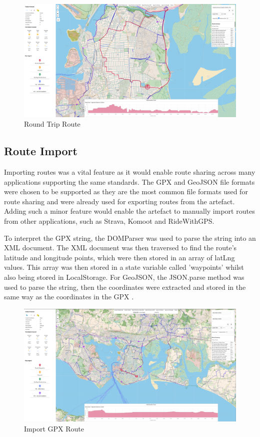 \begin{figure}[!ht]
  \centering
  \includegraphics[width=425px]{figures/Progress Images/Iteration-3/SR11/SR11- Round Trip functionality working.png}
  \caption{Round Trip Route}
  \label{fig:round-trip}
\end{figure}

\subsection{Route Import}
\label{iteration3:route-import}

Importing routes was a vital feature as it would enable route sharing across many applications supporting the same standards. The GPX and GeoJSON file formats were chosen to be supported as they are the most common file formats used for route sharing and were already used for exporting routes from the artefact. Adding such a minor feature would enable the artefact to manually import routes from other applications, such as Strava, Komoot and RideWithGPS.

To interpret the GPX string, the DOMParser was used to parse the string into an XML document. The XML document was then traversed to find the route's latitude and longitude points, which were then stored in an array of latLng values. This array was then stored in a state variable called 'waypoints' whilst also being stored in LocalStorage. For GeoJSON, the JSON.parse method was used to parse the string, then the coordinates were extracted and stored in the same way as the coordinates in the GPX .


\begin{figure}[!ht]
  \centering
  \includegraphics[width=425px]{figures/Progress Images/Iteration-3/SR48-49/SR48-Import GPX.png}
  \caption{Import GPX Route}
  \label{fig:gpx-import}
\end{figure}

